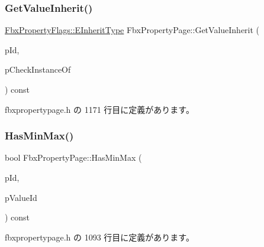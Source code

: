 \mbox{\label{class_fbx_property_page_a44e32a9788c02fdafcfdbf6e698fada2}} 
\subsubsection{\texorpdfstring{Get\+Value\+Inherit()}{GetValueInherit()}}
{\footnotesize\ttfamily \hyperlink{class_fbx_property_flags_ae3b667a4fcac4b827fa186a698fec2f8}{Fbx\+Property\+Flags\+::\+E\+Inherit\+Type} Fbx\+Property\+Page\+::\+Get\+Value\+Inherit (\begin{DoxyParamCaption}\item[{\hyperlink{fbxtypes_8h_a088fa96de3b0b3ea69f0f6afef525dfb}{Fbx\+Int}}]{p\+Id,  }\item[{bool}]{p\+Check\+Instance\+Of }\end{DoxyParamCaption}) const\hspace{0.3cm}{\ttfamily [inline]}}



 fbxpropertypage.\+h の 1171 行目に定義があります。

\mbox{\label{class_fbx_property_page_a3d7bbffaca7c15324947766e62f6f6ba}} 
\subsubsection{\texorpdfstring{Has\+Min\+Max()}{HasMinMax()}}
{\footnotesize\ttfamily bool Fbx\+Property\+Page\+::\+Has\+Min\+Max (\begin{DoxyParamCaption}\item[{\hyperlink{fbxtypes_8h_a088fa96de3b0b3ea69f0f6afef525dfb}{Fbx\+Int}}]{p\+Id,  }\item[{\hyperlink{class_fbx_property_info_a83069f079a29bde133f2e9324de5af43}{Fbx\+Property\+Info\+::\+E\+Value\+Index}}]{p\+Value\+Id }\end{DoxyParamCaption}) const\hspace{0.3cm}{\ttfamily [inline]}}



 fbxpropertypage.\+h の 1093 行目に定義があります。

